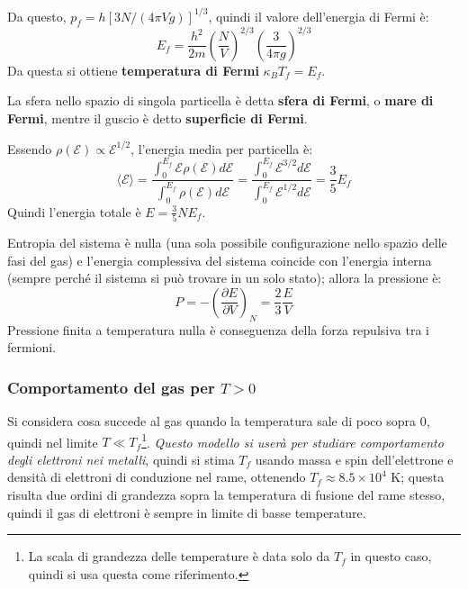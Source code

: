 \documentclass[10pt, a4paper]{scrartcl}
\numberwithin{equation}{subsection}
\theoremstyle{style1}
\begin{document}
Da questo, $p_f = h [3N / (4\pi V g)] ^{1 / 3}$, quindi il valore dell'energia di Fermi \`e:
\begin{equation}
	E_f = \frac{h^2}{2m} \left(\frac{N}{V}\right) ^{2/3} \left(\frac{3}{4\pi g} \right) ^{2 /3 }
\end{equation}
Da questa si ottiene \textbf{temperatura di Fermi} $\kappa _B T_f = E_f$. 

La sfera nello spazio di singola particella \`e detta \textbf{sfera di Fermi}, o \textbf{mare di Fermi}, mentre il guscio \`e detto \textbf{superficie di Fermi}.

Essendo $\rho (\mathscr{E}) \propto \mathscr{E}^{1 / 2} $, l'energia media per particella è:
\begin{equation}
	\langle \mathscr{E} \rangle = \frac{\displaystyle \int_{0} ^{E_f} \mathscr{E}\rho (\mathscr{E}) d \mathscr{E}}{\displaystyle \int_{0} ^{E_f} \rho (\mathscr{E}) d\mathscr{E}} = \frac{ \displaystyle \int_{0} ^{E_f} \mathscr{E}^{3 / 2}  d \mathscr{E}}{\displaystyle  \int_{0} ^{E_f} \mathscr{E}^{1 / 2}  d \mathscr{E}}= \frac{3}{5} E_f
\end{equation}
Quindi l'energia totale \`e $E = \frac{3}{5} N E_f$. 

Entropia del sistema \`e nulla (una sola possibile configurazione nello spazio delle fasi del gas) e l'energia complessiva del sistema coincide con l'energia interna (sempre perché il sistema si pu\`o trovare in un solo stato); allora la pressione \`e:
\begin{equation}\label{Pf}
P = - \left(\frac{\partial E}{\partial V} \right) _N = \frac{2}{3} \frac{E}{V}
\end{equation}
Pressione finita a temperatura nulla \`e conseguenza della forza repulsiva tra i fermioni.	
\subsubsection{Comportamento del gas per $T>0$}
Si considera cosa succede al gas quando la temperatura sale di poco sopra $0$, quindi nel limite $T \ll T_f$\footnote{La scala di grandezza delle temperature \`e data solo da $T_f$ in questo caso, quindi si usa questa come riferimento.}. \textit{Questo modello si user\`a per studiare comportamento degli elettroni nei metalli}, quindi si stima $T_f$ usando massa e spin dell'elettrone e densit\`a di elettroni di conduzione nel rame, ottenendo $T_f \approx 8.5 \times 10^4$ K; questa risulta due ordini di grandezza sopra la temperatura di fusione del rame stesso, quindi il gas di elettroni \`e sempre in limite di basse temperature.
\end{document}
